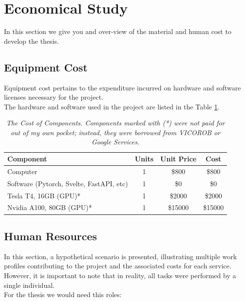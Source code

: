 \section{Economical Study}

In this section we give you and over-view of the material and human cost to
develop the thesis.

\subsection{Equipment Cost}

Equipment cost pertains to the expenditure incurred on hardware and software
licenses necessary for the project. \\

The hardware and software used in the project are listed in the Table
\ref{table:equipment_cost}.

\begin{table}[H]
  \centering
  \begin{tabular}{lccc}
    \toprule
    \textbf{Component} & \textbf{Units} & \textbf{Unit Price} & \textbf{Cost} \\
    \midrule
    Computer & 1 & \$800 & \$800 \\
    Software (Pytorch, Svelte, FastAPI, etc) & 1 & \$0 & \$0 \\
    Tesla T4, 16GB (GPU)* & 1 & \$2000 & \$2000 \\
    Nvidia A100, 80GB (GPU)* & 1 & \$15000 & \$15000 \\
    \bottomrule
  \end{tabular}
  \caption[The Cost of Components.]
  {\textit{The Cost of Components.
  Components marked with (*) were not paid for out of my own pocket; instead, they were borrowed from VICOROB or
  Google Services. }}
  {\label{table:equipment_cost}}
\end{table}

\subsection{Human Resources}

In this section, a hypothetical scenario is presented, illustrating multiple
work profiles contributing to the project and the associated costs for each
service. However, it is important to note that in reality, all tasks were
performed by a single individual. \\

For the thesis we would need this roles: \\

